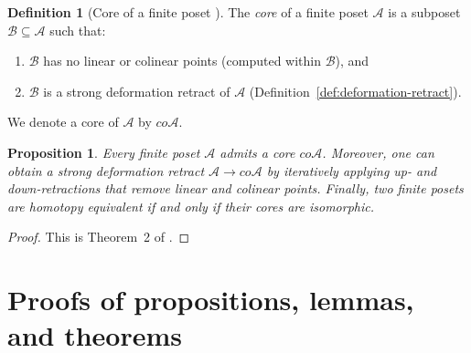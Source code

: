 \documentclass{article}
\theoremstyle{plain}
\newtheorem{proposition}[theorem]{Proposition}
\theoremstyle{definition}
\newtheorem{definition}[theorem]{Definition}
\theoremstyle{remark}
\newcommand{\B}{\mathcal{B}}
\newcommand{\A}{\mathcal{A}}
\newcommand{\<}{\langle}
\renewcommand{\>}{\rangle}
\begin{document}
\begin{definition}[Core of a finite poset {\cite{Stong1966FiniteTopologicalSpaces}}]\label{def:core}
The \emph{core} of a finite poset $\A$ is a subposet $\B\subseteq\A$ such that:
\begin{enumerate}
\item $\B$ has no linear or colinear points (computed within $\B$), and
\item $\B$ is a strong deformation retract of $\A$ (Definition~\ref{def:deformation-retract}).
\end{enumerate}
We denote a core of $\A$ by $co\A$.
\end{definition}

\begin{proposition}\label{core-poset-obtained}
Every finite poset $\A$ admits a core $co\A$. Moreover, one can obtain a strong deformation retract $\A\to co\A$
by iteratively applying up- and down-retractions that remove linear and colinear points.
Finally, two finite posets are homotopy equivalent if and only if their cores are isomorphic.
\end{proposition}

\begin{proof}
This is Theorem~2 of \cite{Stong1966FiniteTopologicalSpaces}.
\end{proof}



\section{Proofs of propositions, lemmas, and theorems}\label{sec:proofs}
\end{document}
